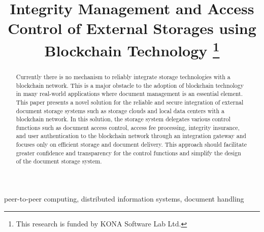 \documentclass[conference]{IEEEtran}
\begin{document}
\title{Integrity Management and Access Control of External Storages using Blockchain Technology 
	\thanks{This research is funded by KONA Software Lab Ltd.}
}

\author{
	\and
}
\maketitle

\begin{abstract}
Currently there is no mechanism to reliably integrate storage technologies with a blockchain  network. This is a major obstacle to the adoption of blockchain technology in many real-world applications where document management is an essential element. This paper presents a novel solution for the reliable and secure integration of external document storage systems such as storage clouds and local data centers with a blockchain network. In this solution, the storage system delegates various control functions such as document access control, access fee processing, integrity insurance, and user authentication to the blockchain network through an integration gateway and focuses only on efficient storage and document delivery. This approach should facilitate greater confidence and transparency for the control functions and simplify the design of the document storage system.    
\end{abstract}

\begin{IEEEkeywords}
peer-to-peer computing, distributed information systems, document handling  
\end{IEEEkeywords}








             

       



 


\end{document}
